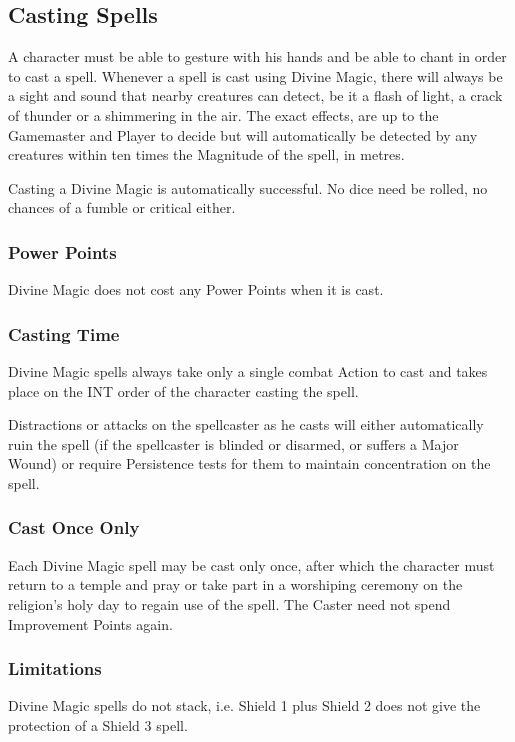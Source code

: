 \subsection{Casting Spells}
A character must be able to gesture with his hands and be able to chant in order to cast a spell. Whenever a spell is cast using Divine Magic, there will always be a sight and sound that nearby creatures can detect, be it a flash of light, a crack of thunder or a shimmering in the air. The exact effects, are up to the Gamemaster and Player to decide but will automatically be detected by any creatures within ten times the Magnitude of the spell, in metres. 

Casting a Divine Magic is automatically successful. No dice need be rolled, no chances of a fumble or critical either.

\subsubsection{Power Points}
Divine Magic does not cost any Power Points when it is cast.

\subsubsection{Casting Time}
Divine Magic spells always take only a single combat Action to cast and takes place on the INT order of the character casting the spell.

Distractions or attacks on the spellcaster as he casts will either automatically ruin the spell (if the spellcaster is blinded or disarmed, or suffers a Major Wound) or require Persistence tests for them to maintain concentration on the spell. 

\subsubsection{Cast Once Only}
Each Divine Magic spell may be cast only once, after which the character must return to a temple and pray or take part in a worshiping ceremony on the religion’s holy day to regain use of the spell. The Caster need not spend Improvement Points again. 

\subsubsection{Limitations}
Divine Magic spells do not stack, i.e. Shield 1 plus Shield 2 does not give the protection of a Shield 3 spell.

